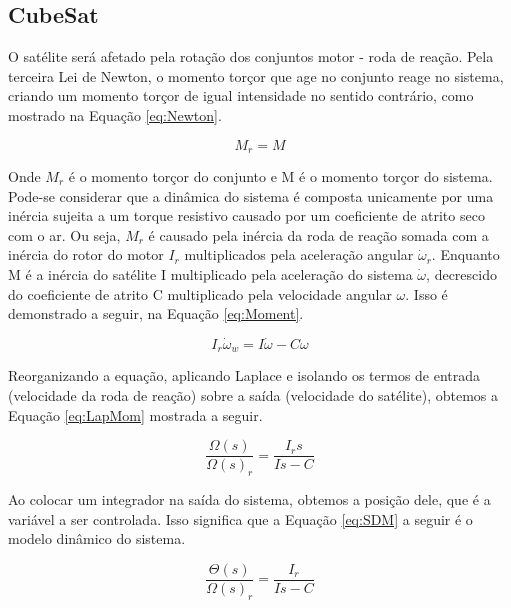 \documentclass[
	12pt,				%
	openany,			%
	twoside,			%
	a4paper,			%
	english,			%
	french,				%
	spanish,			%
	brazil,				%
	oldfontcommands
	]{abntex2}
\begin{document}
\subsection{CubeSat}

O satélite será afetado pela rotação dos conjuntos motor - roda de reação. Pela terceira Lei de Newton, o momento torçor que age no conjunto reage no sistema, criando um momento torçor de igual intensidade no sentido contrário, como mostrado na Equação \ref{eq:Newton}.

\begin{equation}
M_{r} = M
\label{eq:Newton}
\end{equation}

Onde $M_{r}$ é o momento torçor do conjunto e M é o momento torçor do sistema. Pode-se considerar que a dinâmica do sistema é composta unicamente por uma inércia sujeita a um torque resistivo causado por um coeficiente de atrito seco com o ar. Ou seja, $M_{r}$ é causado pela inércia da roda de reação somada com a inércia do rotor do motor $I_{r}$ multiplicados pela aceleração angular $\dot{\omega}_{r}$. Enquanto M é a inércia do satélite I multiplicado pela aceleração do sistema $\dot{\omega}$,  decrescido do coeficiente de atrito C multiplicado pela velocidade angular $\omega$. Isso é demonstrado a seguir, na Equação \ref{eq:Moment}.

\begin{equation}
I_{r}\dot{\omega}_{w} = I\dot{\omega} - C\omega
\label{eq:Moment}
\end{equation}

Reorganizando a equação, aplicando Laplace e isolando os termos de entrada (velocidade da roda de reação) sobre a saída (velocidade do satélite), obtemos a Equação \ref{eq:LapMom} mostrada a seguir.

\begin{equation}
\frac{\Omega(s)}{\Omega(s)_{r}} = \frac{I_{r}s}{Is - C}
\label{eq:LapMom}
\end{equation}

Ao colocar um integrador na saída do sistema, obtemos a posição dele, que é a variável a ser controlada. Isso significa que a Equação \ref{eq:SDM} a seguir é o modelo dinâmico do sistema.

\begin{equation}
\frac{\Theta(s)}{\Omega(s)_{r}} = \frac{I_{r}}{Is - C}
\label{eq:SDM}
\end{equation}

\end{document}
